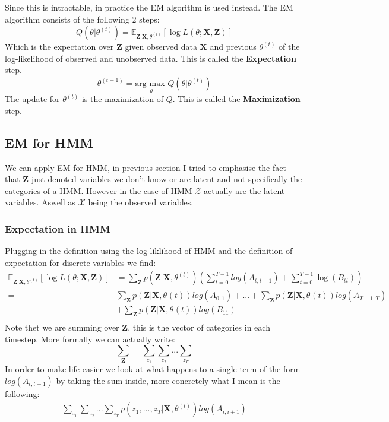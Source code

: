 Since this is intractable, in practice the EM algorithm is used instead. The EM algorithm consists of the following 2 steps:
\begin{equation}
Q(\theta|\theta^{(t)}) = \mathbb{E}_{\textbf{Z}|\textbf{X}, \theta^{(t)}}[\log L(\theta;\textbf{X},\textbf{Z})]
\end{equation}
Which is the expectation over $\textbf{Z}$ given observed data $\textbf{X}$ and previous $\theta^{(t)}$ of the log-likelihood of observed and unobserved data. This is called the \textbf{Expectation} step.
\begin{equation}
\theta^{(t+1)} = \underset{\theta}{\text{arg max }} Q(\theta|\theta^{(t)}) 
\end{equation}
The update for $\theta^{(t)}$ is the maximization of $Q$. This is called the \textbf{Maximization} step.
\pagebreak
\subsection{EM for HMM}
We can apply EM for HMM, in previous section I tried to emphasise the fact that $\textbf{Z}$ just denoted variables we don't know or are latent and not specifically the categories of a HMM. However in the case of HMM $\mathcal{Z}$ actually are the latent variables. Aswell as $\mathcal{X}$ being the observed variables.
\subsubsection{Expectation in HMM}
Plugging in the definition using the log liklihood of HMM and the definition of expectation for discrete variables we find:
\begin{equation}
\begin{split}
\mathbb{E}_{\textbf{Z}|\textbf{X}, \theta^{(t)}}[\log L(\theta;\textbf{X},\textbf{Z})] &= \sum_{\textbf{Z}}p(\textbf{Z}|\textbf{X},\theta^{(t)})\left(\sum_{t=0}^{T-1} log(A_{t,t+1}) + \sum_{t=0}^{T-1} \log(B_{tt}) \right)\\
=& \sum_{\textbf{Z}}p(\mathbf{Z}|\mathbf{X},\theta^{}(t))log(A_{0,1}) + ... + \sum_{\textbf{Z}}p(\mathbf{Z}|\mathbf{X},\theta^{}(t))log(A_{T-1,T}) \\&+ \sum_{\textbf{Z}}p(\mathbf{Z}|\mathbf{X},\theta^{}(t))log(B_{11})\\
\end{split}
\end{equation}
Note thet we are summing over $\textbf{Z}$, this is the vector of categories in each timestep. More formally we can actually write:
\begin{equation}
\sum_{\textbf{Z}} = \sum_{z_1}\sum_{z_2}...\sum_{z_T}
\end{equation}
In order to make life easier we look at what happens to a single term of the form $log(A_{t,t+1})$ by taking the sum inside, more concretely what I mean is the following:
\begin{equation}
\begin{split}
\sum_{z_1}\sum_{z_2}...\sum_{z_T}p(z_1,...,z_T|\mathbf{X},\theta^{(t)})log(A_{i,i+1})
\end{split}
\end{equation}
 
